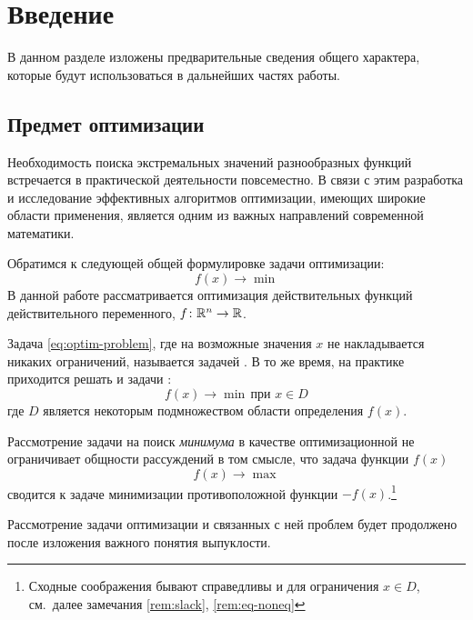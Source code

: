 \section{Введение}
В данном разделе изложены предварительные сведения общего характера,
которые будут использоваться в дальнейших частях работы.

\subsection{Предмет оптимизации}

Необходимость поиска экстремальных значений разнообразных функций
встречается в практической деятельности повсеместно. В связи с этим
разработка и исследование эффективных алгоритмов оптимизации, имеющих
широкие области применения, является одним из важных направлений
современной математики.

Обратимся к следующей общей формулировке задачи оптимизации:
\begin{equation}
  \label{eq:optim-problem}
  f(x) \to \min
\end{equation}
В данной работе рассматривается оптимизация действительных функций
действительного переменного, $f\colon \mathbb{R}^n \to \mathbb{R}$.

Задача \eqref{eq:optim-problem}, где на возможные значения $x$ не
накладывается никаких ограничений, называется задачей
. В то же время, на практике
приходится решать и задачи :
\begin{equation}
  \label{eq:optim-problem-c}
  f(x) \to \min\, \text{при } x \in D
\end{equation}
где $D$ является некоторым подмножеством области определения $f(x)$.

\begin{rem}
  Рассмотрение задачи на поиск \emph{минимума} в качестве
  оптимизационной не ограничивает общности рассуждений в том смысле,
  что задача  функции $f(x)$
  \begin{equation*}
    f(x) \to \max
  \end{equation*}
  сводится к задаче минимизации противоположной функции
  $-f(x)$.\footnote{Сходные соображения бывают справедливы и для
    ограничения \mbox{$x \in D$}, см. далее замечания \ref{rem:slack},
    \ref{rem:eq-noneq}}
\end{rem}

Рассмотрение задачи оптимизации и связанных с ней проблем будет
продолжено после изложения важного понятия выпуклости.



